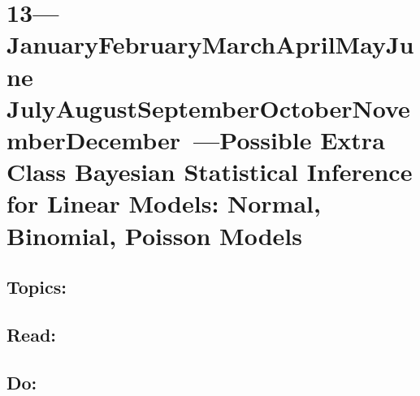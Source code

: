 \documentclass[10pt]{article}
\def\themonth{\ifcase\month\or
  January\or February\or March\or April\or May\or June\or
  July\or August\or September\or October\or November\or December\fi}
\begin{document}
\AdvanceDate[7]
\section{13---\themonth~\the\day---Possible Extra Class Bayesian Statistical Inference for Linear Models: Normal, Binomial, Poisson Models}


\subsection{Topics:}

\subsection{Read:}

\subsection{Do:}
\end{document}
